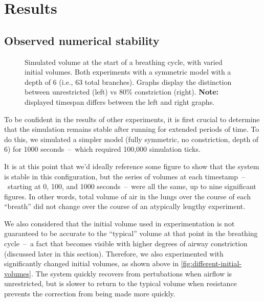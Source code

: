 %
\section{Results} \label{sec:results}

\subsection{Observed numerical stability}

\begin{figure}[ht!]
    \centering
    \begin{tikzpicture}[scale=0.8]
        
        
    \end{tikzpicture}
    \caption{
        Simulated volume at the start of a breathing cycle, with varied initial volumes. Both
        experiments with a symmetric model with a depth of 6 (i.e., 63 total branches). Graphs
        display the distinction between unrestricted (left) vs 80\% constriction (right).
        \textbf{Note:} displayed timespan differs between the left and right graphs.
    }
    \label{fig:different-initial-volumes}
\end{figure}

To be confident in the results of other experiments, it is first crucial to determine that the
simulation remains stable after running for extended periods of time. To do this, we simulated a
simpler model (fully symmetric, no constriction, depth of 6) for 1000 seconds~--~which required
100,000 simulation ticks.

It is at this point that we'd ideally reference some figure to show that the system is stable in
this configuration, but the series of volumes at each timestamp~--~starting at 0, 100, and 1000
seconds~--~were all the same, up to nine significant figures. In other words, total volume of air in
the lungs over the course of each ``breath'' did not change over the course of an atypically lengthy
experiment.

\breakpars

We also considered that the initial volume used in experimentation is not guaranteed to be accurate
to the ``typical'' volume at that point in the breathing cycle~--~a fact that becomes visible with
higher degrees of airway constriction (discussed later in this section). Therefore, we also
experimented with significantly changed initial volumes, as shown above in
\autoref{fig:different-initial-volumes}. The system quickly recovers from pertubations when
airflow is unrestricted, but is slower to return to the typical volume when resistance prevents the
correction from being made more quickly.

